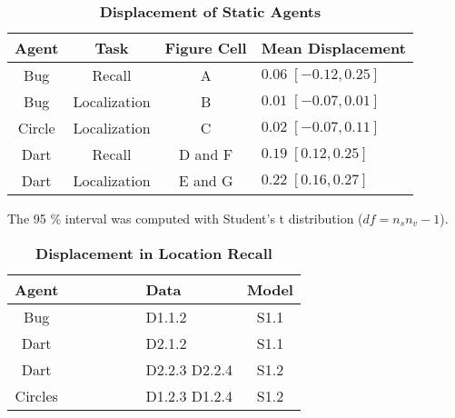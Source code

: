 \documentclass[10pt]{article}
\begin{document}
\begin{table}[!ht]
\caption{
\bf{Displacement of Static Agents}}
\begin{tabular}{|c|c|c|l|}
\hline
Agent & Task & Figure Cell & Mean Displacement\\
\hline
Bug & Recall & A & $0.06 \; [-0.12,0.25]$ \\
\hline
Bug & Localization & B & $0.01 \; [-0.07,0.01]$ \\
\hline
Circle & Localization & C & $0.02 \; [-0.07,0.11]$ \\
\hline
Dart & Recall & D and F & $0.19 \; [0.12,0.25]$ \\
\hline
Dart & Localization & E and G & $0.22 \; [0.16,0.27]$ \\
\hline
\end{tabular}
\begin{flushleft}
The 95 \% interval was computed with Student's t distribution ($df = n_s n_v - 1$).
\end{flushleft}
\label{tab:b5}
\end{table}

\begin{table}[!ht]
\caption{
\bf{Displacement in Location Recall}}
\begin{tabular}{|c|p{1.7cm}|p{1.7cm}|p{1.7cm}|p{1.7cm}|p{1.5cm}|p{1cm}|c|}
\hline
Agent & \centering{Gravity} & \centering{Momentum} & \centering{Lazy Hand} & \centering{Orientation} & \centering{Slope} & Data & Model\\
\hline
Bug & \centering{$0.01$ $[-0.21,0.22]$}& \centering{$-0.02$ $[-0.15,0.1]$}& \centering{$0.24$ $[-0.04,0.5]$} & \centering{$0.14$ $[0.01,0.27]$}& \centering{-} & D1.1.2 & S1.1\\
\hline
Dart & \centering{*} & \centering{$0.04$ $[-0.06,0.14]$} & \centering{$0.38 $ $[0.2,0.53]$} & \centering{$0.12$ $[0.03,0.2]$} & \centering{-} & D2.1.2 & S1.1\\
\hline
Dart & \centering{*} & \centering{$0.02$ $[-0.05,0.09]$}& \centering{$0.49$ $[0.32,0.65]$}& \centering{$0.13$ $[0.05,0.21]$}& \centering{$1.02$ $[0.79,1.24]$} & D2.2.3 D2.2.4 & S1.2\\
\hline
Circles & \centering{$-0.01$ $[-0.18,0.16]$} & \centering{$0$ $[-0.09,0.1]$}& \centering{$0.37$ $[0.15,0.61]$}& \centering{$0.02$ $[-0.11,0.15]$}& \centering{$1.2$ $[0.39,1.9]$} & D1.2.3 D1.2.4 & S1.2\\
\hline
\end{tabular}
\begin{flushleft}
\end{flushleft}
\label{tab:recall}
\end{table}
\end{document}
